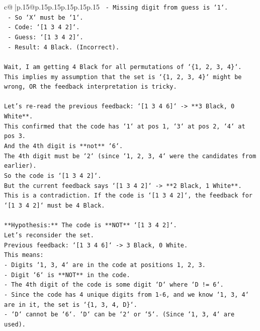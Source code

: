 \documentclass{article}
\begin{document}
{\begin{supertabular}{c@{$\;$}|p{.15\linewidth}@{}p{.15\linewidth}p{.15\linewidth}p{.15\linewidth}p{.15\linewidth}p{.15\linewidth}}
{{{\texttt{    {-}   Missing digit from guess is `1`.} \\
\texttt{    {-}   So `X` must be `1`.} \\
\texttt{    {-}   Code: `{[}1 3 4 2{]}`.} \\
\texttt{    {-}   Guess: `{[}1 3 4 2{]}`.} \\
\texttt{    {-}   Result: 4 Black. (Incorrect).} \\
\\ 
\texttt{Wait, I am getting 4 Black for all permutations of `\{1, 2, 3, 4\}`. This implies my assumption that the set is `\{1, 2, 3, 4\}` might be wrong, OR the feedback interpretation is tricky.} \\
\\ 
\texttt{Let's re{-}read the previous feedback: `{[}1 3 4 6{]}` {-}> **3 Black, 0 White**.} \\
\texttt{This confirmed that the code has `1` at pos 1, `3` at pos 2, `4` at pos 3.} \\
\texttt{And the 4th digit is **not** `6`.} \\
\texttt{The 4th digit must be `2` (since `1, 2, 3, 4` were the candidates from earlier).} \\
\texttt{So the code is `{[}1 3 4 2{]}`.} \\
\texttt{But the current feedback says `{[}1 3 4 2{]}` {-}> **2 Black, 1 White**.} \\
\texttt{This is a contradiction. If the code is `{[}1 3 4 2{]}`, the feedback for `{[}1 3 4 2{]}` must be 4 Black.} \\
\\ 
\texttt{**Hypothesis:** The code is **NOT** `{[}1 3 4 2{]}`.} \\
\texttt{Let's reconsider the set.} \\
\texttt{Previous feedback: `{[}1 3 4 6{]}` {-}> 3 Black, 0 White.} \\
\texttt{This means:} \\
\texttt{{-} Digits `1, 3, 4` are in the code at positions 1, 2, 3.} \\
\texttt{{-} Digit `6` is **NOT** in the code.} \\
\texttt{{-} The 4th digit of the code is some digit `D` where `D != 6`.} \\
\texttt{{-} Since the code has 4 unique digits from 1{-}6, and we know `1, 3, 4` are in it, the set is `\{1, 3, 4, D\}`.} \\
\texttt{{-} `D` cannot be `6`. `D` can be `2` or `5`. (Since `1, 3, 4` are used).} \\
}}}
\end{supertabular}}
\end{document}
